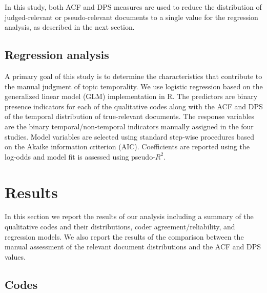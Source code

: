 \documentclass[runningheads,a4paper]{llncs}
\begin{document}
In this study, both ACF and DPS measures are used to reduce the distribution of judged-relevant or pseudo-relevant documents to a single value for the regression analysis, as described in the next section.

\subsection{Regression analysis}

A primary goal of this study is to determine the characteristics that contribute to the manual judgment of topic temporality. We use logistic regression based on the generalized linear model (GLM) implementation in R. The predictors are binary presence indicators for each of the qualitative codes along with the ACF and DPS of the temporal distribution of true-relevant documents.  The response variables are the binary temporal/non-temporal indicators manually assigned in the four studies.  Model variables are selected using standard step-wise procedures based on the Akaike information criterion (AIC). Coefficients are reported using the log-odds and model fit is assessed using pseudo-$R^2$.

\section{Results}

In this section we report the results of our analysis including a summary of the qualitative codes and their distributions, coder agreement/reliability, and regression models. We also report the results of the comparison between the manual assessment of the relevant document distributions and the ACF and DPS values.

\subsection{Codes}
\end{document}
